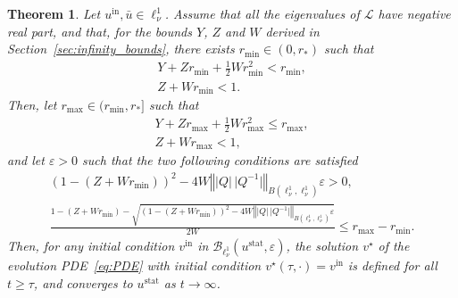 \documentclass[10pt,a4paper]{article}
\theoremstyle{plain}
\newtheorem{theorem}{Theorem}[section]
\newcommand{\B}{\mathcal{B}}
\renewcommand{\B}{\mathcal{B}}
\renewcommand{\L}{\mathcal{L}}
\newcommand{\bu}{\bar{u}}
\newcommand{\1}{\mathbf{1}}
\newcommand{\rstar}{r_*}
\newcommand{\uin}{{u^{\mathrm{in}}}}
\newcommand{\vin}{{v^{\mathrm{in}}}}
\newcommand{\stat}{\mathrm{stat}}
\begin{document}
\begin{theorem}
\label{thm:stability}
Let $\uin,\bu\in\ell^1_\nu$. Assume that all the eigenvalues of $\L$ have negative real part, and that, for the bounds $Y$, $Z$ and $W$ derived in Section~\ref{sec:infinity_bounds}, there exists $r_{\min}\in(0,\rstar)$ such that
\begin{align*}
Y + Z r_{\min} + \frac{1}{2}W r_{\min}^2 < r_{\min}, \\
Z + W r_{\min} < 1.
\end{align*}
Then, let $r_{\max}\in(r_{\min},\rstar]$ such that
\begin{align*}
Y + Z r_{\max} + \frac{1}{2}W r_{\max}^2 \leq r_{\max}, \\
Z + W r_{\max} < 1,
\end{align*}
and let $\varepsilon>0$ such that the two following conditions are satisfied
\begin{align}
\left(1-(Z+Wr_{\min})\right)^2 - 4 W\left\Vert \vert Q\vert\, \vert Q^{-1}\vert \right\Vert_{B(\ell^1_\nu,\ell^1_\nu)}\varepsilon >0,
\label{eq:epsilon1}\\
\frac{1-(Z+Wr_{\min}) - \sqrt{\left(1-(Z+Wr_{\min})\right)^2 - 4 W\left\Vert \vert Q\vert\, \vert Q^{-1}\vert \right\Vert_{B(\ell^1_\nu,\ell^1_\nu)}\varepsilon}}{2W} \leq r_{\max}-r_{\min}.
\label{eq:epsilon2}
\end{align} 
Then, for any initial condition $\vin$ in $\B_{\ell^1_\nu}(u^\stat,\varepsilon)$, the solution $v^\star$ of the evolution PDE~\eqref{eq:PDE} with initial condition $v^\star(\tau,\cdot) = \vin$ is defined for all $t\geq \tau$, and converges to $u^\stat$ as $t\to\infty$.
\end{theorem}
%
\end{document}
